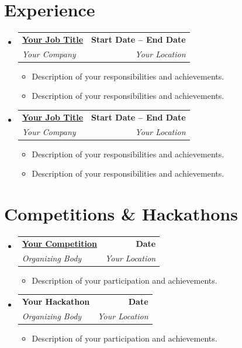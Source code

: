\documentclass[a4paper,11pt]{article}
\makeatletter
\newcommand{\resumeItem}[1]{
  \item\small{
    {#1 \vspace{-2pt}}
  }
}
\newcommand{\resumeSubheading}[4]{
  \vspace{-2pt}\item
    \begin{tabular*}{0.97\textwidth}[t]{l@{\extracolsep{\fill}}r}
      \textbf{#1} & \textbf{\small #2} \\
      \textit{\small#3} & \textit{\small #4} \\
    \end{tabular*}\vspace{-7pt}
}
\newcommand{\resumeSubSubheading}[2]{
    \item
    \begin{tabular*}{0.97\textwidth}{l@{\extracolsep{\fill}}r}
      \textit{\small#1} & \textit{\small #2} \\
    \end{tabular*}\vspace{-7pt}
}
\newcommand{\resumeSubHeadingListStart}{\begin{itemize}[leftmargin=0.15in, label={}]}
\newcommand{\resumeSubHeadingListEnd}{\end{itemize}}
\newcommand{\resumeItemListStart}{\begin{itemize}}
\newcommand{\resumeItemListEnd}{\end{itemize}\vspace{-5pt}}
\makeatother
\begin{document}
    
\section{Experience}
    \resumeSubHeadingListStart
        \resumeSubheading
            {\href{https://yourcompany.com}{Your Job Title}}{Start Date -- End Date}
            {Your Company}{Your Location}
            \resumeItemListStart
                \resumeItem{Description of your responsibilities and achievements.}
                \resumeItem{Description of your responsibilities and achievements.}
        \resumeItemListEnd
        \resumeSubheading
            {\href{https://yourcompany.com}{Your Job Title}}{Start Date -- End Date}
            {Your Company}{Your Location}
            \resumeItemListStart
                \resumeItem{Description of your responsibilities and achievements.}
                \resumeItem{Description of your responsibilities and achievements.}
        \resumeItemListEnd
    \resumeSubHeadingListEnd

\section{Competitions \& Hackathons}
    \resumeSubHeadingListStart
        \resumeSubheading
            {\href{https://yourcompetition.com}{Your Competition}}{Date}
            {Organizing Body}{Your Location}
            \resumeItemListStart
                \resumeItem{Description of your participation and achievements.}
        \resumeItemListEnd
        \resumeSubheading
            {Your Hackathon}{Date}
            {Organizing Body}{Your Location}
            \resumeItemListStart
                \resumeItem{Description of your participation and achievements.}
        \resumeItemListEnd
    \resumeSubHeadingListEnd

\end{document}
